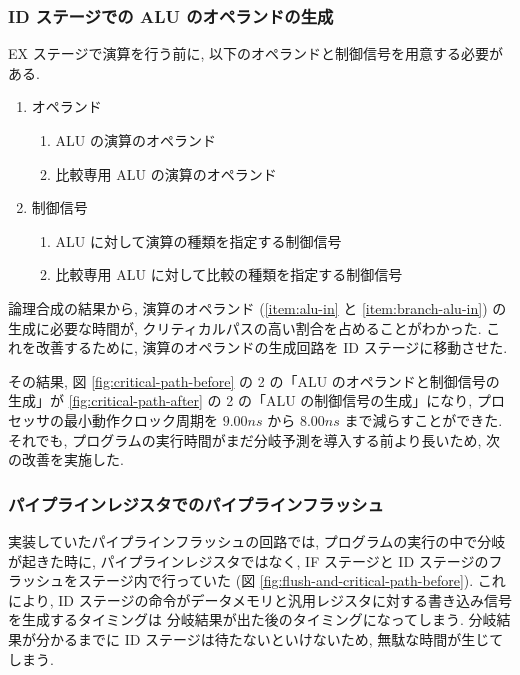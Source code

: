 \documentclass[../improvements.tex]{subfiles}
\begin{document}
  \subsubsection{ID ステージでの ALU のオペランドの生成} \label{subsubsection:ex-to-id}
  EX ステージで演算を行う前に, 以下のオペランドと制御信号を用意する必要がある.
  \begin{enumerate}
    \item オペランド
      \begin{enumerate}
        \item ALU の演算のオペランド \label{item:alu-in}
        \item 比較専用 ALU の演算のオペランド \label{item:branch-alu-in}
      \end{enumerate}
    \item 制御信号
      \begin{enumerate}
        \item ALU に対して演算の種類を指定する制御信号 \label{item:alu-op}
        \item 比較専用 ALU に対して比較の種類を指定する制御信号 \label{item:branch-alu-op}
      \end{enumerate}
  \end{enumerate}
  論理合成の結果から, 演算のオペランド (\ref{item:alu-in} と \ref{item:branch-alu-in}) の生成に必要な時間が, 
  クリティカルパスの高い割合を占めることがわかった.
  これを改善するために, 演算のオペランドの生成回路を ID ステージに移動させた.

  その結果, 図 \ref{fig:critical-path-before} の 2 の「ALU のオペランドと制御信号の生成」が
  \ref{fig:critical-path-after} の 2 の「ALU の制御信号の生成」になり, 
  プロセッサの最小動作クロック周期を $9.00\unit{ns}$ から $8.00\unit{ns}$ まで減らすことができた.
  それでも, プログラムの実行時間がまだ分岐予測を導入する前より長いため, 次の改善を実施した.

  \subsubsection{パイプラインレジスタでのパイプラインフラッシュ} \label{subsubsection:rethink-flush}
  実装していたパイプラインフラッシュの回路では, 
  プログラムの実行の中で分岐が起きた時に, 
  パイプラインレジスタではなく, IF ステージと ID ステージのフラッシュをステージ内で行っていた (図 \ref{fig:flush-and-critical-path-before}).
  これにより, ID ステージの命令がデータメモリと汎用レジスタに対する書き込み信号を生成するタイミングは
  分岐結果が出た後のタイミングになってしまう.
  分岐結果が分かるまでに ID ステージは待たないといけないため, 無駄な時間が生じてしまう.
\end{document}
